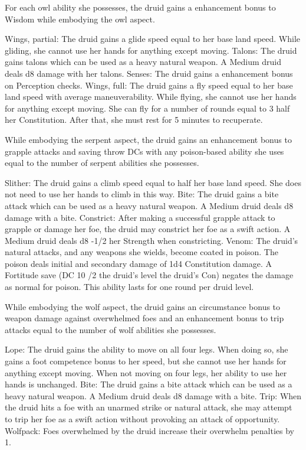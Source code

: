 For each owl ability she possesses, the druid gains a  enhancement bonus to Wisdom  while embodying the owl aspect.
\begin{wildaspect}
\wilditem Wings, partial: The druid gains a glide speed equal to her base land speed. While gliding, she cannot use her hands for anything except moving.
\wilditem Talons: The druid gains talons which can be used as a heavy natural weapon. A Medium druid deals d8 damage with her talons.
\wilditem Senses: The druid gains a  enhancement bonus on Perception checks.
\wilditem Wings, full: The druid gains a fly speed equal to her base land speed with average maneuverability. While flying, she cannot use her hands for anything except moving. She can fly for a number of rounds equal to 3 \add half her Constitution. After that, she must rest for 5 minutes to recuperate.
\end{wildaspect}

While embodying the serpent aspect, the druid gains an enhancement bonus to grapple attacks and saving throw DCs with any poison-based ability she uses equal to the number of serpent abilities she possesses.
\begin{wildaspect}
\wilditem Slither: The druid gains a climb speed equal to half her base land speed. She does not need to use her hands to climb in this way.
\wilditem Bite: The druid gains a bite attack which can be used as a heavy natural weapon. A Medium druid deals d8 damage with a bite.
\wilditem Constrict: After making a successful grapple attack to grapple or damage her foe, the druid may constrict her foe as a swift action. A Medium druid deals d8 -1/2 her Strength when constricting.
\wilditem Venom: The druid's natural attacks, and any weapons she wields, become coated in poison. The poison deals initial and secondary damage of 1d4 Constitution damage. A Fortitude save (DC 10 /2 the druid's level \add the druid's Con) negates the damage as normal for poison. This ability lasts for one round per druid level.
\end{wildaspect}

While embodying the wolf aspect, the druid gains an circumstance bonus to weapon damage against overwhelmed foes and an enhancement bonus to trip attacks equal to the number of wolf abilities she possesses.
\begin{wildaspect}
\wilditem Lope: The druid gains the ability to move on all four legs. When doing so, she gains a  foot competence bonus to her speed, but she cannot use her hands for anything except moving. When not moving on four legs, her ability to use her hands is unchanged.
\wilditem Bite: The druid gains a bite attack which can be used as a heavy natural weapon. A Medium druid deals d8 damage with a bite.
\wilditem Trip: When the druid hits a foe with an unarmed strike or natural attack, she may attempt to trip her foe as a swift action without provoking an attack of opportunity.
\wilditem Wolfpack: Foes overwhelmed by the druid increase their overwhelm penalties by 1.
\end{wildaspect}

